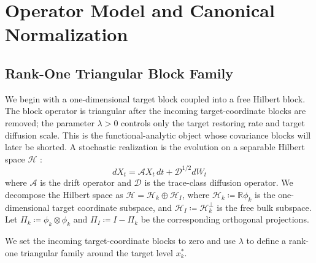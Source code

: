 \documentclass[preprint,12pt]{elsarticle}
\theoremstyle{plain}
\theoremstyle{definition}
\theoremstyle{remark}
\begin{document}

    \section{Operator Model and Canonical Normalization}
    \label{sec:setup}

    \subsection{Rank-One Triangular Block Family}
    \label{sec:setup:evolution}

    We begin with a one-dimensional target block coupled into a free Hilbert
    block.  The block operator is triangular after the incoming target-coordinate
    blocks are removed; the parameter $\lambda>0$ controls only the target
    restoring rate and target diffusion scale.  This is the functional-analytic
    object whose covariance blocks will later be shorted.  A stochastic
    realization is the evolution on a separable Hilbert space $\mathcal{H}$
    \cite{daprato2014stochastic}:
    \begin{equation}
        \label{eq:stochastic_evolution}
        dX_t = \mathcal{A} X_t \, dt + \mathcal{D}^{1/2} dW_t
    \end{equation}
    where $\mathcal{A}$ is the drift operator and $\mathcal{D}$ is the trace-class diffusion operator. We decompose the Hilbert space as $\mathcal{H} = \mathcal{H}_k \oplus \mathcal{H}_I$, where $\mathcal{H}_k \coloneqq \mathbb{R}\phi_k$ is the one-dimensional target coordinate subspace, and $\mathcal{H}_I \coloneqq \mathcal{H}_k^\perp$ is the free bulk subspace. Let $\Pi_k \coloneqq \phi_k \otimes \phi_k$ and $\Pi_I \coloneqq I - \Pi_k$ be the corresponding orthogonal projections.

    We set the incoming target-coordinate blocks to zero and use $\lambda$ to
    define a rank-one triangular family around the target level $x_k^*$.
\end{document}
